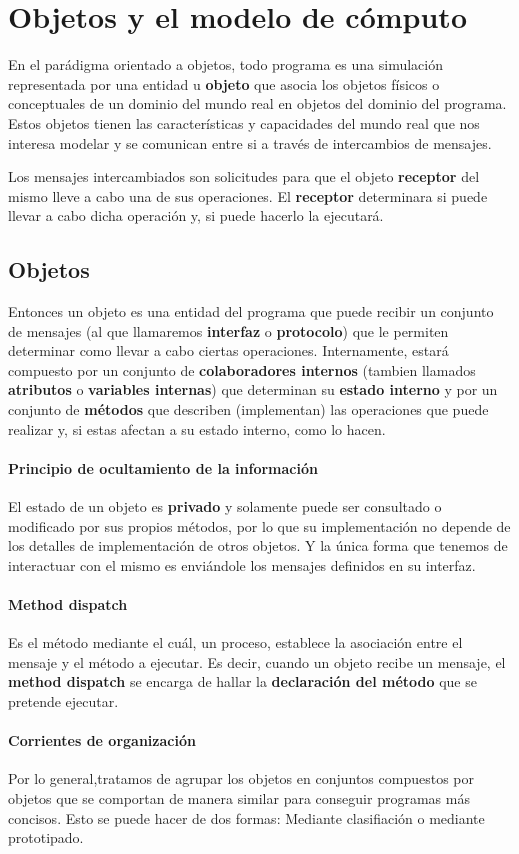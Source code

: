 \section{Objetos y el modelo de cómputo}

En el parádigma orientado a objetos, todo programa es una simulación representada por una entidad u \textbf{objeto} que asocia los objetos físicos o conceptuales de un dominio del mundo real en objetos del dominio del programa. Estos objetos tienen las características y capacidades del mundo real que nos interesa modelar y se comunican entre si a través de intercambios de mensajes.

Los mensajes intercambiados son solicitudes para que el objeto \textbf{receptor} del mismo lleve a cabo una de sus operaciones. El \textbf{receptor} determinara si puede llevar a cabo dicha operación y, si puede hacerlo la ejecutará.

\subsection{Objetos}
Entonces un objeto es una entidad del programa que puede recibir un conjunto de mensajes (al que llamaremos \textbf{interfaz} o \textbf{protocolo}) que le permiten determinar como llevar a cabo ciertas operaciones. Internamente, estará compuesto por un conjunto de \textbf{colaboradores internos} (tambien llamados \textbf{atributos} o \textbf{variables internas}) que determinan su \textbf{estado interno} y por un conjunto de \textbf{métodos} que describen (implementan) las operaciones que puede realizar y, si estas afectan a su estado interno, como lo hacen.

\paragraph{Principio de ocultamiento de la información}
El estado de un objeto es \textbf{privado} y solamente puede ser consultado o modificado por sus propios métodos, por lo que su implementación no depende de los detalles de implementación de otros objetos. Y la única forma que tenemos de interactuar con el mismo es enviándole los mensajes definidos en su interfaz.

\paragraph{Method dispatch} Es el método mediante el cuál, un proceso, establece la asociación entre el mensaje y el método a ejecutar. Es decir, cuando un objeto recibe un mensaje, el \textbf{method dispatch} se encarga de hallar la \textbf{declaración del método} que se pretende ejecutar.

\paragraph{Corrientes de organización}
Por lo general,tratamos de agrupar los objetos en conjuntos compuestos por objetos que se comportan de manera similar para conseguir programas más concisos. Esto se puede hacer de dos formas: Mediante clasifiación o mediante prototipado.